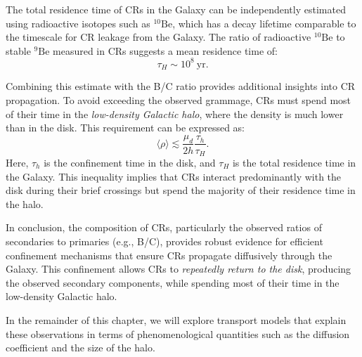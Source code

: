 The total residence time of CRs in the Galaxy can be independently estimated using radioactive isotopes such as \(^{10}\text{Be}\), which has a decay lifetime comparable to the timescale for CR leakage from the Galaxy. The ratio of radioactive \(^{10}\text{Be}\) to stable \(^{9}\text{Be}\) measured in CRs suggests a mean residence time of:  
\[
\tau_H \sim 10^8~\text{yr}.
\]  

Combining this estimate with the B/C ratio provides additional insights into CR propagation. To avoid exceeding the observed grammage, CRs must spend most of their time in the \emph{low-density Galactic halo}, where the density is much lower than in the disk. This requirement can be expressed as:  
\[
\langle \rho \rangle \lesssim \frac{\mu_d}{2h} \frac{\tau_h}{\tau_H}.
\]  
Here, \(\tau_h\) is the confinement time in the disk, and \(\tau_H\) is the total residence time in the Galaxy. This inequality implies that CRs interact predominantly with the disk during their brief crossings but spend the majority of their residence time in the halo.  

In conclusion, the composition of CRs, particularly the observed ratios of secondaries to primaries (e.g., B/C), provides robust evidence for efficient confinement mechanisms that ensure CRs propagate diffusively through the Galaxy. This confinement allows CRs to \emph{repeatedly return to the disk}, producing the observed secondary components, while spending most of their time in the low-density Galactic halo.

In the remainder of this chapter, we will explore transport models that explain these observations in terms of phenomenological quantities such as the diffusion coefficient and the size of the halo.  
